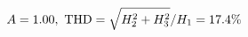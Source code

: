 \documentclass[preview]{standalone}
\begin{document}
\begin{align*}
\special{dvisvgm:raw <g id='unique000'>}A=1.00,\ \text{THD}=\sqrt{H_2^2+H_3^2}/H_1=17.4\%\special{dvisvgm:raw </g>}
\end{align*}
\end{document}
